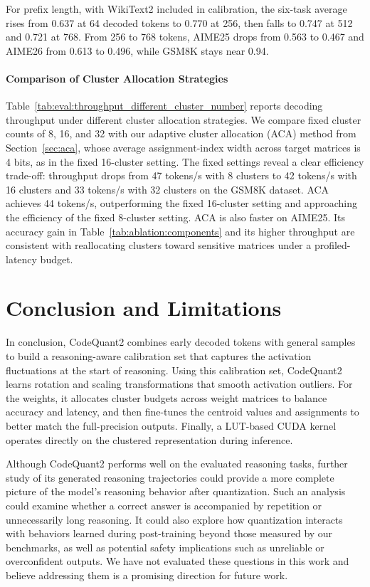 \documentclass{article}
\begin{document}
For prefix length, with WikiText2 included in calibration, the six-task average rises from 0.637 at 64 decoded tokens to 0.770 at 256, then falls to 0.747 at 512 and 0.721 at 768. From 256 to 768 tokens, AIME25 drops from 0.563 to 0.467 and AIME26 from 0.613 to 0.496, while GSM8K stays near 0.94. 

\paragraph{Comparison of Cluster Allocation Strategies}
Table~\ref{tab:eval:throughput_different_cluster_number} reports decoding throughput under different cluster allocation strategies. We compare fixed cluster counts of 8, 16, and 32 with our adaptive cluster allocation (ACA) method from Section~\ref{sec:aca}, whose average assignment-index width across target matrices is 4 bits, as in the fixed 16-cluster setting. The fixed settings reveal a clear efficiency trade-off: throughput drops from 47 tokens/s with 8 clusters to 42 tokens/s with 16 clusters and 33 tokens/s with 32 clusters on the GSM8K dataset. ACA achieves 44 tokens/s, outperforming the fixed 16-cluster setting and approaching the efficiency of the fixed 8-cluster setting. ACA is also faster on AIME25. Its accuracy gain in Table~\ref{tab:ablation:components} and its higher throughput are consistent with reallocating clusters toward sensitive matrices under a profiled-latency budget.

\section{Conclusion and Limitations}
In conclusion, CodeQuant2 combines early decoded tokens with general samples to build a reasoning-aware calibration set that captures the activation fluctuations at the start of reasoning. Using this calibration set, CodeQuant2 learns rotation and scaling transformations that smooth activation outliers. For the weights, it allocates cluster budgets across weight matrices to balance accuracy and latency, and then fine-tunes the centroid values and assignments to better match the full-precision outputs. Finally, a LUT-based CUDA kernel operates directly on the clustered representation during inference.

Although CodeQuant2 performs well on the evaluated reasoning tasks, further study of its generated reasoning trajectories could provide a more complete picture of the model's reasoning behavior after quantization. Such an analysis could examine whether a correct answer is accompanied by repetition or unnecessarily long reasoning. It could also explore how quantization interacts with behaviors learned during post-training beyond those measured by our benchmarks, as well as potential safety implications such as unreliable or overconfident outputs. We have not evaluated these questions in this work and believe addressing them is a promising direction for future work.
\end{document}
